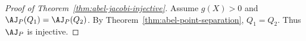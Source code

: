 \begin{proof}[Proof of Theorem~\ref{thm:abel-jacobi-injective}]
Assume \(g(X)>0\) and \(\AJ_P(Q_1)=\AJ_P(Q_2)\). By
Theorem~\ref{thm:abel-point-separation}, \(Q_1=Q_2\). Thus \(\AJ_P\) is
injective.
\end{proof}

